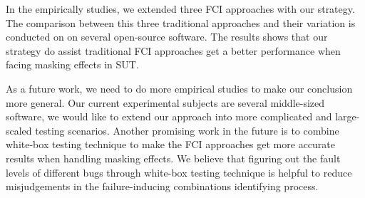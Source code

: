 \documentclass{sig-alternate}
\begin{document}
In the empirically studies, we extended three FCI approaches with our strategy. The comparison between this three traditional approaches and their variation is conducted on on several open-source software. The results shows that our strategy do assist traditional FCI approaches get a better performance when facing masking effects in SUT.

As a future work, we need to do more empirical studies to make our conclusion more general. Our current experimental subjects are several middle-sized software, we would like to extend our approach into more complicated and large-scaled testing scenarios. Another promising work in the future is to combine white-box testing technique to make the FCI approaches get more accurate results when handling masking effects. We believe that figuring out the fault levels of different bugs through white-box testing technique is helpful to reduce misjudgements in the failure-inducing combinations identifying process.


\end{document}
